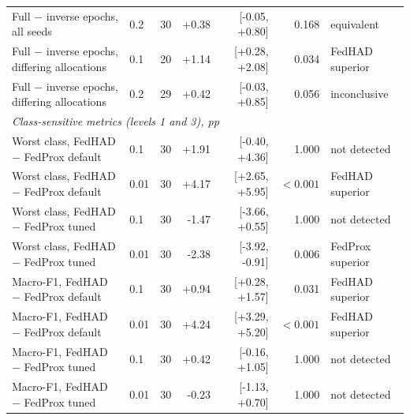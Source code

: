 \begin{tabular}{llrrrrl}
Full $-$ inverse epochs, all seeds & 0.2 & 30 & +0.38 & [-0.05, +0.80] & 0.168 & equivalent \\
Full $-$ inverse epochs, differing allocations & 0.1 & 20 & +1.14 & [+0.28, +2.08] & 0.034 & FedHAD superior \\
Full $-$ inverse epochs, differing allocations & 0.2 & 29 & +0.42 & [-0.03, +0.85] & 0.056 & inconclusive \\
\multicolumn{7}{l}{\textit{Class-sensitive metrics (levels 1 and 3), pp}} \\
Worst class, FedHAD $-$ FedProx default & 0.1 & 30 & +1.91 & [-0.40, +4.36] & 1.000 & not detected \\
Worst class, FedHAD $-$ FedProx default & 0.01 & 30 & +4.17 & [+2.65, +5.95] & $<0.001$ & FedHAD superior \\
Worst class, FedHAD $-$ FedProx tuned & 0.1 & 30 & -1.47 & [-3.66, +0.55] & 1.000 & not detected \\
Worst class, FedHAD $-$ FedProx tuned & 0.01 & 30 & -2.38 & [-3.92, -0.91] & 0.006 & FedProx superior \\
Macro-F1, FedHAD $-$ FedProx default & 0.1 & 30 & +0.94 & [+0.28, +1.57] & 0.031 & FedHAD superior \\
Macro-F1, FedHAD $-$ FedProx default & 0.01 & 30 & +4.24 & [+3.29, +5.20] & $<0.001$ & FedHAD superior \\
Macro-F1, FedHAD $-$ FedProx tuned & 0.1 & 30 & +0.42 & [-0.16, +1.05] & 1.000 & not detected \\
Macro-F1, FedHAD $-$ FedProx tuned & 0.01 & 30 & -0.23 & [-1.13, +0.70] & 1.000 & not detected \\
\bottomrule
\end{tabular}
